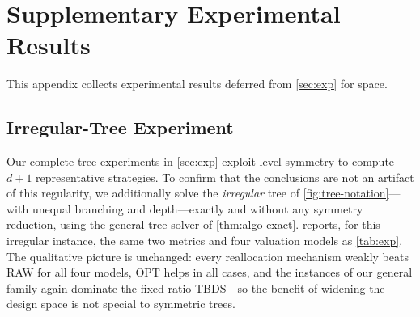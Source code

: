 \newpage
\section{Supplementary Experimental Results}
\label{sec:app-experiments}

This appendix collects experimental results deferred from \cref{sec:exp} for space.

\subsection{Irregular-Tree Experiment}
\label{app:irregular}
Our complete-tree experiments in \cref{sec:exp} exploit level-symmetry to compute $d+1$ representative strategies. To confirm that the conclusions are not an artifact of this regularity, we additionally solve the \emph{irregular} tree of \cref{fig:tree-notation}---with unequal branching and depth---exactly and without any symmetry reduction, using the general-tree solver of \cref{thm:algo-exact}.
 reports, for this irregular instance, the same two metrics and four valuation models as \cref{tab:exp}. The qualitative picture is unchanged: every reallocation mechanism weakly beats RAW for all four models, OPT helps in all cases, and the instances of our general family again dominate the fixed-ratio TBDS---so the benefit of widening the design space is not special to symmetric trees.

